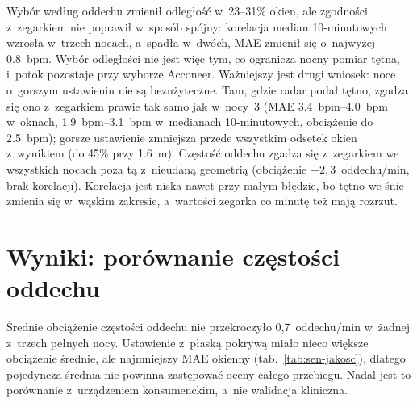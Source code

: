 \documentclass[12pt,a4paper,oneside]{report}
\begin{document}
Wybór według oddechu zmienił odległość w~23--31\% okien, ale zgodności z~zegarkiem nie poprawił
w~sposób spójny: korelacja median 10-minutowych wzrosła w~trzech nocach, a~spadła w~dwóch, MAE
zmienił się o~najwyżej \SI{0.8}{bpm}. Wybór odległości nie jest więc tym, co ogranicza nocny pomiar
tętna, i~potok pozostaje przy wyborze Acconeer. Ważniejszy jest drugi wniosek: noce o~gorszym
ustawieniu nie są bezużyteczne. Tam, gdzie radar podał tętno, zgadza się ono z~zegarkiem prawie
tak samo jak w~nocy~3 (MAE \SIrange{3.4}{4.0}{bpm} w~oknach, \SIrange{1.9}{3.1}{bpm} w~medianach
10-minutowych, obciążenie do \SI{2.5}{bpm}); gorsze ustawienie zmniejsza przede wszystkim odsetek okien
z~wynikiem (do 45\% przy \SI{1.6}{m}). Częstość oddechu zgadza się z~zegarkiem we wszystkich nocach
poza tą z~nieudaną geometrią (obciążenie $-2{,}3$~oddechu/min, brak korelacji). Korelacja jest
niska nawet przy małym błędzie, bo tętno we śnie zmienia się w~wąskim zakresie, a~wartości zegarka
co minutę też mają rozrzut.

\section{Wyniki: porównanie częstości oddechu}

\begin{table}[H]
\centering
\caption{Porównanie częstości oddechu (okna snu): radar vs Garmin Fenix~7.}
\label{tab:rr}
\small
{}
\end{table}

Średnie obciążenie częstości oddechu nie przekroczyło
0{,}7~oddechu/min w~żadnej z~trzech pełnych nocy. Ustawienie
z~płaską pokrywą miało nieco większe obciążenie średnie, ale najmniejszy MAE
okienny (tab.~\ref{tab:sen-jakosc}), dlatego pojedyncza średnia nie powinna
zastępować oceny całego przebiegu. Nadal jest to porównanie z~urządzeniem
konsumenckim, a~nie walidacja kliniczna.
\end{document}
